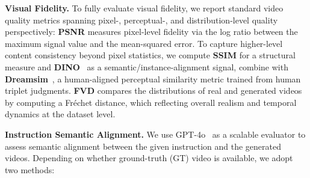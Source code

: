 \textbf{Visual Fidelity.}
To fully evaluate visual fidelity, we report standard video quality metrics spanning pixel-, perceptual-, and distribution-level quality perspectively: \textbf{PSNR}\cite{fardo2016formalevaluationpsnrquality} measures pixel-level fidelity via the log ratio between the maximum signal value and the mean-squared error. To capture higher-level content consistency beyond pixel statistics, we compute \textbf{SSIM}\cite{1284395} for a structural measure and \textbf{DINO}~\cite{Oquab2023DINOv2} as a semantic/instance-alignment signal, combine with \textbf{Dreamsim}~\cite{fu2023dreamsim}, a human-aligned perceptual similarity metric trained from human triplet judgments. \textbf{FVD}\cite{unterthiner2018towards} compares the distributions of real and generated videos by computing a Fréchet distance, which reflecting overall realism and temporal dynamics at the dataset level. 


\textbf{Instruction Semantic Alignment.}
We use GPT-4o~\cite{hurst2024gpt} as a scalable evaluator to assess semantic alignment between the given instruction and the generated videos. Depending on whether ground-truth (GT) video is available, we adopt two methods:

